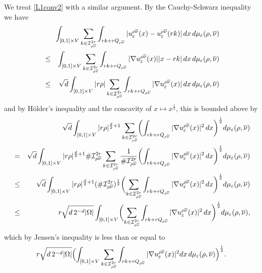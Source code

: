 \documentclass[11pt,a4paper,reqno]{amsart}
\theoremstyle{plain}
\theoremstyle{definition}
\newcommand\e{\varepsilon}
\theoremstyle{remark}
\begin{document}
We treat \eqref{L1conv2} with a similar argument. By the Cauchy-Schwarz inequality we have
\begin{eqnarray*} && \hskip-3cm \nonumber
    \int_{[0,1]\times V} \sum_{k\in \mathcal{I}^{2r}_{\rho\overline{\nu}}} \int_{rk+rQ_{\rho\overline{\nu}}} |u^{\rho\overline{\nu}}_\e(x) - u_\e^{\rho\overline{\nu}}(rk)|\,dx\,d\mu_\e(\rho,\overline{\nu}) \\ \nonumber
    &\leq& \int_{[0,1]\times V} \sum_{k\in \mathcal{I}^{2r}_{\rho\overline{\nu}}} \int_{rk+rQ_{\rho\overline{\nu}}} |\nabla u^{\rho\overline{\nu}}_\e(x)||x-rk|\,dx\,d\mu_\e(\rho,\overline{\nu}) \\ \nonumber
    &\leq& \sqrt{d}\int_{[0,1]\times V} |r\rho| \sum_{k\in \mathcal{I}^{2r}_{\rho\overline{\nu}}} \int_{rk+rQ_{\rho\overline{\nu}}} |\nabla u^{\rho\overline{\nu}}_\e(x)|\,dx\,d\mu_\e(\rho,\overline{\nu})
\end{eqnarray*}
and by H\"older's inequality and the concavity of $x \mapsto x^\frac{1}{2}$, this is bounded above by
\begin{eqnarray*} && \hskip-1.2cm \nonumber
\hskip-0.6cm \sqrt{d}\int_{[0,1]\times V} |r\rho|^{\frac{d}{2}+1}  \sum_{k\in \mathcal{I}^{2r}_{\rho\overline{\nu}}} \biggl(\int_{rk+rQ_{\rho\overline{\nu}}} |\nabla u^{\rho\overline{\nu}}_\e(x)|^2\,dx\biggr)^{\frac{1}{2}} d\mu_\e(\rho,\overline{\nu}) \\ \nonumber
&=& \sqrt{d}\int_{[0,1]\times V} |r\rho|^{\frac{d}{2}+1}  \#\mathcal{I}^{2r}_{\rho\overline{\nu}} \sum_{k\in \mathcal{I}^{2r}_{\rho\overline{\nu}}} \frac{1}{\#\mathcal{I}^{2r}_{\rho\overline{\nu}}} \biggl(\int_{rk+rQ_{\rho\overline{\nu}}} |\nabla u^{\rho\overline{\nu}}_\e(x)|^2\,dx\biggr)^{\frac{1}{2}} d\mu_\e(\rho,\overline{\nu}) \\ \nonumber
&\leq& \sqrt{d}\int_{[0,1]\times V} |r\rho|^{\frac{d}{2}+1}  (\#\mathcal{I}^{2r}_{\rho\overline{\nu}})^{\frac{1}{2}} \biggl(\sum_{k\in \mathcal{I}^{2r}_{\rho\overline{\nu}}} \int_{rk+rQ_{\rho\overline{\nu}}} |\nabla u^{\rho\overline{\nu}}_\e(x)|^2\,dx\biggr)^{\frac{1}{2}} d\mu_\e(\rho,\overline{\nu}) \\ \nonumber
&\leq& r\sqrt{d \, 2^{-d} |\Omega|}\int_{[0,1]\times V}  \biggl(\sum_{k\in \mathcal{I}^{2r}_{\rho\overline{\nu}}} \int_{rk+rQ_{\rho\overline{\nu}}} |\nabla u^{\rho\overline{\nu}}_\e(x)|^2\,dx\biggr)^{\frac{1}{2}} d\mu_\e(\rho, \overline{\nu}), 
\end{eqnarray*}
which by Jensen's inequality is less than or equal to
\begin{equation}\label{liminf8}
r \sqrt{d\, 2^{-d}|\Omega|} \Bigl(  \int_{[0,1]\times V} \sum_{k\in \mathcal{I}^{2r}_{\rho\overline{\nu}}}\int_{rk+rQ_{\rho\overline{\nu}}} |\nabla u_\e^{\rho\overline{\nu}}(x)|^2 dx\, d\mu_\e(\rho,\overline{\nu}) \Bigr)^{\frac{1}{2}}.     
\end{equation}
\end{document}
